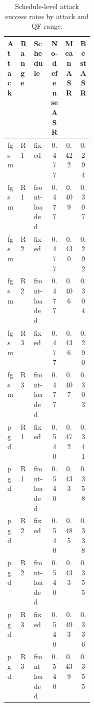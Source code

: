 \begin{table}[t]
\caption{Schedule-level attack success rates by attack and QF range.}
\label{tab:schedule-asr}
\centering
\scriptsize
\begin{tabular}{llp{0.20\linewidth}ccc}
\hline
Attack & Range & Schedule & No-defense ASR & Mean ASR & Best ASR \\
\hline
fgsm & R1 & fixed & 0.477 & 0.422 & 0.294 \\
fgsm & R1 & front-loaded & 0.477 & 0.409 & 0.307 \\
fgsm & R2 & fixed & 0.477 & 0.430 & 0.292 \\
fgsm & R2 & front-loaded & 0.477 & 0.406 & 0.304 \\
fgsm & R3 & fixed & 0.477 & 0.436 & 0.290 \\
fgsm & R3 & front-loaded & 0.477 & 0.407 & 0.303 \\
pgd & R1 & fixed & 0.540 & 0.472 & 0.341 \\
pgd & R1 & front-loaded & 0.540 & 0.433 & 0.358 \\
pgd & R2 & fixed & 0.540 & 0.485 & 0.338 \\
pgd & R2 & front-loaded & 0.540 & 0.433 & 0.355 \\
pgd & R3 & fixed & 0.540 & 0.493 & 0.336 \\
pgd & R3 & front-loaded & 0.540 & 0.439 & 0.355 \\
\hline
\end{tabular}
\end{table}
